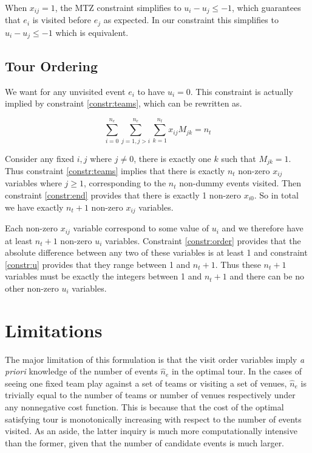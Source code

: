 \documentclass[11pt]{article}
\begin{document}
When $x_{ij} = 1$, the MTZ constraint simplifies to $u_i - u_j \leq -1$, which guarantees that $e_i$ is visited before $e_j$ as expected. In our constraint this simplifies to $u_i - u_j \leq -1$ which is equivalent.

\subsection{Tour Ordering}
We want for any unvisited event $e_i$ to have $u_i = 0$. This constraint is actually implied by constraint \eqref{constr:teams}, which can be rewritten as.

\begin{equation}
    \sum_{i=0}^{n_e} \sum_{j = 1, j > i}^{n_e} \sum_{k=1}^{n_t} x_{ij} M_{jk} = n_t
\end{equation}

Consider any fixed $i, j$ where $j \neq 0$, there is exactly one $k$ such that $M_{jk} = 1$. Thus constraint \eqref{constr:teams} implies that there is exactly $n_t$ non-zero $x_{ij}$ variables where $j \geq 1$, corresponding to the $n_t$ non-dummy events visited. Then constraint \eqref{constr:end} provides that there is exactly 1 non-zero $x_{i0}$. So in total we have exactly $n_t + 1$ non-zero $x_{ij}$ variables.

Each non-zero $x_{ij}$ variable correspond to some value of $u_i$ and we therefore have at least $n_t + 1$ non-zero $u_i$ variables. Constraint \eqref{constr:order} provides that the absolute difference between any two of these variables is at least 1 and constraint \eqref{constr:u} provides that they range between 1 and $n_t + 1$. Thus these $n_t + 1$ variables must be exactly the integers between 1 and $n_t + 1$ and there can be no other non-zero $u_i$ variables.

\section{Limitations}
The major limitation of this formulation is that the visit order variables imply \emph{a priori} knowledge of the number of events $\hat{n}_e$ in the optimal tour. In the cases of seeing one fixed team play against a set of teams or visiting a set of venues, $\hat{n}_e$ is trivially equal to the number of teams or number of venues respectively under any nonnegative cost function. This is because that the cost of the optimal satisfying tour is monotonically increasing with respect to the number of events visited. As an aside, the latter inquiry is much more computationally intensive than the former, given that the number of candidate events is much larger.
\end{document}
